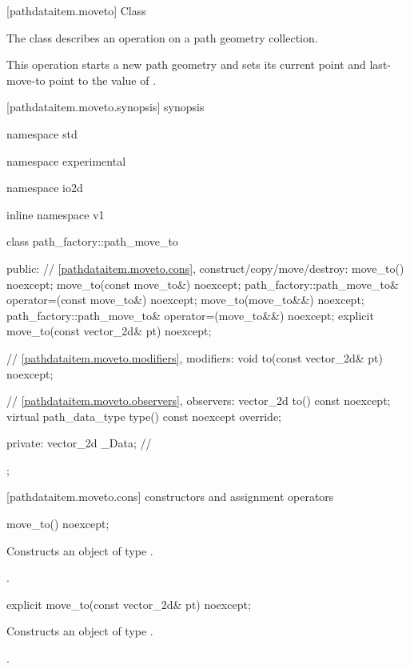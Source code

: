  [pathdataitem.moveto] {Class }

\pnum
{}
The class  describes an operation on a path geometry collection.

\pnum
This operation starts a new path geometry and sets its current point and last-move-to point to the value of .

 [pathdataitem.moveto.synopsis] { synopsis}

\begin{codeblock}
namespace std { namespace experimental { namespace io2d { inline namespace v1 {
  class path_factory::path_move_to {
  public:
    // \ref{pathdataitem.moveto.cons}, construct/copy/move/destroy:
    move_to() noexcept;
    move_to(const move_to&) noexcept;
    path_factory::path_move_to& operator=(const move_to&) noexcept;
    move_to(move_to&&) noexcept;
    path_factory::path_move_to& operator=(move_to&&) noexcept;
    explicit move_to(const vector_2d& pt) noexcept;

    // \ref{pathdataitem.moveto.modifiers}, modifiers:
    void to(const vector_2d& pt) noexcept;

    // \ref{pathdataitem.moveto.observers}, observers:
    vector_2d to() const noexcept;
    virtual path_data_type type() const noexcept override;
    
  private:
    vector_2d _Data; // \expos
  };
} } } }
\end{codeblock}

 [pathdataitem.moveto.cons] { constructors and assignment operators}

\begin{itemdecl}
    move_to() noexcept;
\end{itemdecl}
\begin{itemdescr}
	\pnum
	\effects
	Constructs an object of type .
	
	\pnum
	\postconditions
	.
\end{itemdescr}

\begin{itemdecl}
    explicit move_to(const vector_2d& pt) noexcept;
\end{itemdecl}
\begin{itemdescr}
	\pnum
	\effects
	Constructs an object of type .
	
	\pnum
	\postconditions
	.
\end{itemdescr}

